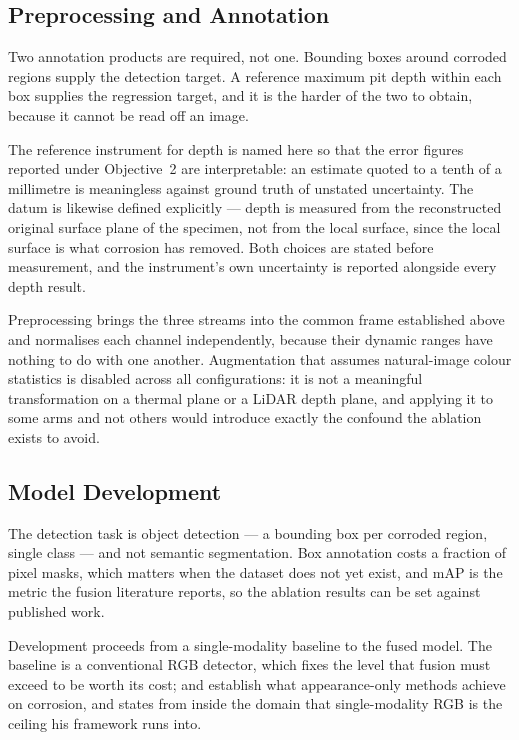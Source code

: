 \subsection{Preprocessing and Annotation}

Two annotation products are required, not one. Bounding boxes around corroded
regions supply the detection target. A reference maximum pit depth within each
box supplies the regression target, and it is the harder of the two to obtain,
because it cannot be read off an image.

The reference instrument for depth is named here so that the error figures
reported under Objective~2 are interpretable: an estimate quoted to a tenth of a
millimetre is meaningless against ground truth of unstated uncertainty. The
datum is likewise defined explicitly --- depth is measured from the reconstructed
original surface plane of the specimen, not from the local surface, since the
local surface is what corrosion has removed. Both choices are stated before
measurement, and the instrument's own uncertainty is reported alongside every
depth result.

Preprocessing brings the three streams into the common frame established above
and normalises each channel independently, because their dynamic ranges have
nothing to do with one another. Augmentation that assumes natural-image colour
statistics is disabled across all configurations: it is not a meaningful
transformation on a thermal plane or a LiDAR depth plane, and applying it to
some arms and not others would introduce exactly the confound the ablation
exists to avoid.

\subsection{Model Development}

The detection task is object detection --- a bounding box per corroded region,
single class --- and not semantic segmentation. Box annotation costs a fraction
of pixel masks, which matters when the dataset does not yet exist, and mAP is
the metric the fusion literature reports, so the ablation results can be set
against published work.

Development proceeds from a single-modality baseline to the fused model. The
baseline is a conventional RGB detector, which fixes the level that fusion must
exceed to be worth its cost; \citet{Alvani2026} and \citet{Imran2025} establish
what appearance-only methods achieve on corrosion, and \citet{Imran2025} states
from inside the domain that single-modality RGB is the ceiling his framework
runs into.

